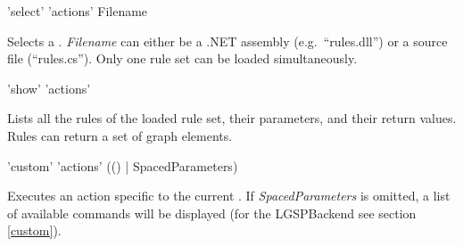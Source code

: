 \begin{rail}
  'select' 'actions' Filename
\end{rail}
Selects a . \emph{Filename} can either be a .NET assembly (e.g.\ ``rules.dll'') or a source file (``rules.cs''). Only one rule set can be loaded simultaneously.

\begin{rail}
  'show' 'actions'
\end{rail}
Lists all the rules of the loaded rule set, their parameters, and their return values. Rules can return a set of graph elements.

\begin{rail}
  'custom' 'actions' (() | SpacedParameters)
\end{rail}
Executes an action specific to the current . If \emph{SpacedParameters} is omitted, a list of available commands will be displayed (for the LGSPBackend see section \ref{custom}).

